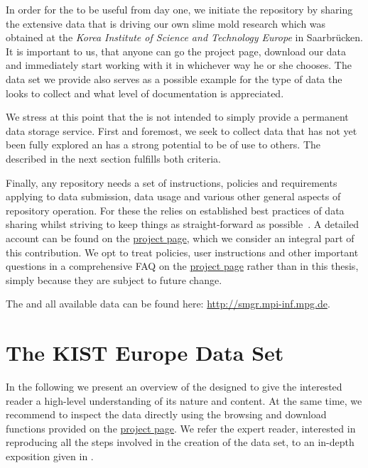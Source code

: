  	In order for the \SMGR to be useful from day one, we initiate the repository by sharing the extensive data that is driving our own slime mold research which was obtained at the \emph{Korea Institute of Science and Technology Europe} in Saarbr\"ucken. It is important to us, that anyone can go the \SMGR project page, download our data and immediately start working with it in whichever way he or she chooses. The data set we provide also serves as a possible example for the type of data the \SMGR looks to collect and what level of documentation is appreciated. 

 	We stress at this point that the \SMGR is not intended to simply provide a permanent data storage service. First and foremost, we seek to collect data that has not yet been fully explored an has a strong potential to be of use to others. The \data described in the next section fulfills both criteria.

	Finally, any repository needs a set of instructions, policies and requirements applying to data submission, data usage and various other general aspects of repository operation. For these the \SMGR relies on established best practices of data sharing whilst striving to keep things as straight-forward as possible~\cite{white2013nine}. A detailed account can be found on the \href{http://smgr.mpi-inf.mpg.de}{\SMGR project page}, which we consider an integral part of this contribution. We opt to treat policies, user instructions and other important questions in a comprehensive FAQ on the \href{http://smgr.mpi-inf.mpg.de}{\SMGR project page} rather than in this thesis, simply because they are subject to future change.

	The \SMGR and all available data can be found here: \href{http://smgr.mpi-inf.mpg.de}{http://smgr.mpi-inf.mpg.de}. 

\section{The KIST Europe Data Set}	

	In the following we present an overview of the \data designed to give the interested reader a high-level understanding of its nature and content. At the same time, we recommend to inspect the data directly using the browsing and download functions provided on the \href{http://smgr.mpi-inf.mpg.de}{\SMGR project page}. We refer the expert reader, interested in reproducing all the steps involved in the creation of the data set, to an in-depth exposition given in .

